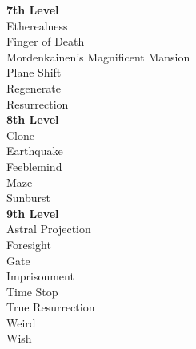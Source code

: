 \textbf{7th Level} \\
 Etherealness \\
 Finger of Death \\
 Mordenkainen's Magnificent Mansion \\
 Plane Shift \\
 Regenerate \\
 Resurrection \\

\textbf{8th Level} \\
 Clone \\
 Earthquake \\
 Feeblemind \\
 Maze \\
 Sunburst \\

\textbf{9th Level} \\
 Astral Projection \\
 Foresight \\
 Gate \\
 Imprisonment \\
 Time Stop \\
 True Resurrection \\
 Weird \\
 Wish \\